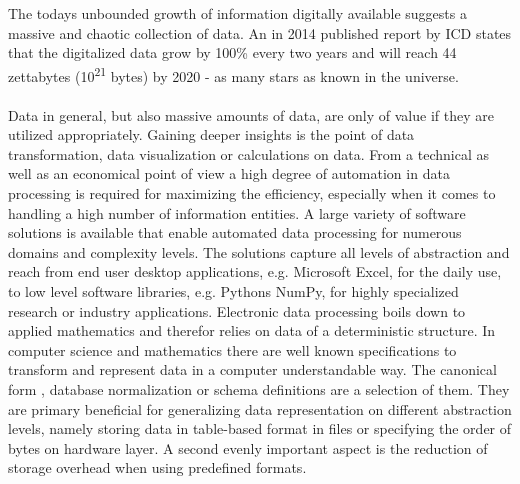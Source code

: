 The todays unbounded growth of information digitally available suggests a massive and chaotic collection of data. An in 2014 published report by ICD states that the digitalized data grow by 100\% every two years and will reach 44 zettabytes (10\textsuperscript{21} bytes) by 2020 - as many stars as known in the universe\cite{data_growth_2014}.
\\\\
Data in general, but also massive amounts of data, are only of value if they are utilized appropriately. Gaining deeper insights is the point of data transformation, data visualization or calculations on data. From a technical as well as an economical point of view a high degree of automation in data processing is required for maximizing the efficiency, especially when it comes to handling a high number of information entities\cite{labrinidis_jagadish_2012}. A large variety of software solutions is available that enable automated data processing for numerous domains and complexity levels. The solutions capture all levels of abstraction and reach from end user desktop applications, e.g. Microsoft Excel\cite{excel_2017}, for the daily use, to low level software libraries, e.g. Pythons NumPy\cite{numpy_2017}, for highly specialized research or industry applications. Electronic data processing boils down to applied mathematics and therefor relies on data of a deterministic structure. In computer science and mathematics there are well known specifications to transform and represent data in a computer understandable way. The canonical form \cite[p. 91 - 96]{dorst_doran_lasenby_2012}, database normalization \cite[p. 743]{halpin_tony_morgan_2010}or schema definitions \cite[p. 62]{halpin_tony_morgan_2010} are a selection of them. They are primary beneficial for generalizing data representation on different abstraction levels, namely storing data in table-based format in files or specifying the order of bytes on hardware layer. A second evenly important aspect is the reduction of storage overhead when using predefined formats.
\\\\
